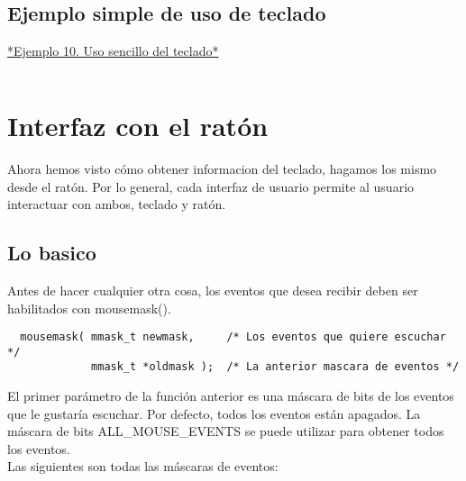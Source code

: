 \documentclass{article}
\begin{document}
\subsection{Ejemplo simple de uso de teclado}%
\href{https://github.com/nasciiboy/NCURSES-Programming-HOWTO/blob/master/ncurses_programs/basics/simple_key.c}{*Ejemplo 10. Uso sencillo del teclado*}
\inputminted{cpp}{./cpp/010_uso_teclado.cpp}

\section{Interfaz con el ratón}%
Ahora hemos visto cómo obtener informacion del teclado, hagamos los mismo desde
el ratón. Por lo general, cada interfaz de usuario permite al usuario
interactuar con ambos, teclado y ratón.
\subsection{Lo basico}%
Antes de hacer cualquier otra cosa, los eventos que desea recibir deben ser
habilitados con mousemask().

\begin{verbatim}
  mousemask( mmask_t newmask,     /* Los eventos que quiere escuchar */
             mmask_t *oldmask );  /* La anterior mascara de eventos */
\end{verbatim}

El primer parámetro de la función anterior es una máscara de bits de los
eventos que le gustaría escuchar. Por defecto, todos los eventos están
apagados. La máscara de bits ALL\_MOUSE\_EVENTS se puede utilizar para obtener
todos los eventos.\\

Las siguientes son todas las máscaras de eventos:
\end{document}
